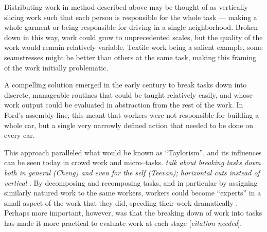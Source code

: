 \documentclass{sigchi}
\begin{document}
Distributing work in method described above may be thought of as vertically slicing work such that 
each person is responsible for the whole task
--- making a whole garment or being responsible for driving in a single neighborhood.
Broken down in this way, work could grow to unprecedented scales,
but the quality of the work would remain relatively variable.
Textile work being a salient example,
some seamstresses might be better than others at the same task,
making this framing of the work initially problematic.

A compelling solution emerged in the early  century to break tasks down into discrete,
manageable routines that could be taught relatively easily,
and whose work output could be evaluated in abstraction from the rest of the work.
In Ford's assembly line, this meant that workers were not responsible for building a whole car,
but a single very narrowly defined action that needed to be done on every car.

This approach paralleled what would be known as ``Taylorism'',
and its influences can be seen today in crowd work and micro--tasks.
\textit{talk about breaking tasks down both in general (Cheng) and even for the self (Teevan);
horizontal cuts instead of vertical}
\cite{cheng2015break,writingMicroTasks}.
By decomposing and recomposing tasks,
and in particular by assigning similarly natured work to the same workers,
workers could become ``experts'' in a small aspect of the work that they did,
speeding their work dramatically
\cite{delayAndOrderLasecki}.
Perhaps more important, however, was that
the breaking down of work into tasks has made it more practical to evaluate work at each stage
[\textit{citation needed}].








\end{document}
